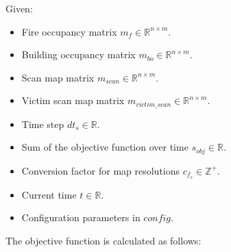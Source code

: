 \documentclass{article}
\begin{document}
Given:
\begin{itemize}
    \item Fire occupancy matrix $m_f \in \mathbb{R}^{n \times m}$.
    \item Building occupancy matrix $m_{bo} \in \mathbb{R}^{n \times m}$.
    \item Scan map matrix $m_{scan} \in \mathbb{R}^{n \times m}$.
    \item Victim scan map matrix $m_{victim\_scan} \in \mathbb{R}^{n \times m}$.
    \item Time step $dt_s \in \mathbb{R}$.
    \item Sum of the objective function over time $s_{obj} \in \mathbb{R}$.
    \item Conversion factor for map resolutions $c_{f_s} \in \mathbb{Z}^+$.
    \item Current time $t \in \mathbb{R}$.
    \item Configuration parameters in $config$.
\end{itemize}

The objective function is calculated as follows:
\end{document}
